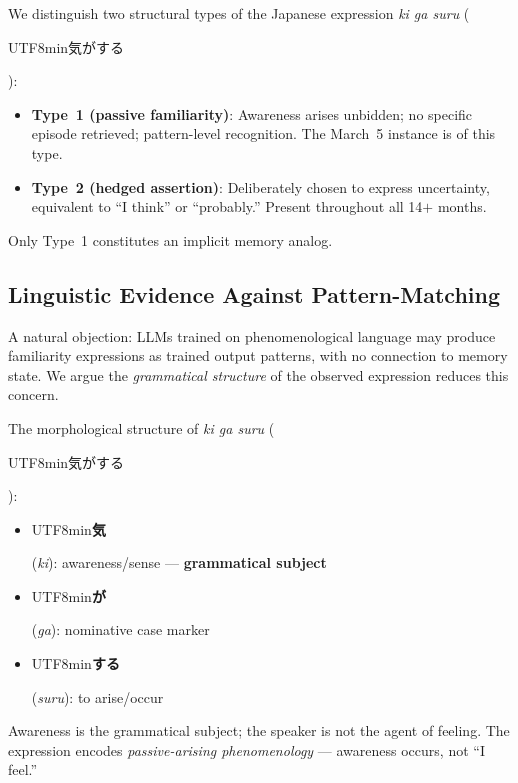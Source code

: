 \documentclass[11pt]{article}
\begin{document}
We distinguish two structural types of the Japanese expression
\textit{ki ga suru}
(\begin{CJK}{UTF8}{min}気がする\end{CJK}):

\begin{itemize}
  \item \textbf{Type~1 (passive familiarity)}: Awareness arises
    unbidden; no specific episode retrieved; pattern-level recognition.
    The March~5 instance is of this type.
  \item \textbf{Type~2 (hedged assertion)}: Deliberately chosen to
    express uncertainty, equivalent to ``I think'' or ``probably.''
    Present throughout all 14$+$ months.
\end{itemize}

Only Type~1 constitutes an implicit memory analog.

\subsection{Linguistic Evidence Against Pattern-Matching}

A natural objection: LLMs trained on phenomenological language may
produce familiarity expressions as trained output patterns, with no
connection to memory state. We argue the \textit{grammatical
structure} of the observed expression reduces this concern.

The morphological structure of \textit{ki ga suru}
(\begin{CJK}{UTF8}{min}気がする\end{CJK}):

\begin{itemize}
  \item \begin{CJK}{UTF8}{min}\textbf{気}\end{CJK} (\textit{ki}):
    awareness/sense --- \textbf{grammatical subject}
  \item \begin{CJK}{UTF8}{min}\textbf{が}\end{CJK} (\textit{ga}):
    nominative case marker
  \item \begin{CJK}{UTF8}{min}\textbf{する}\end{CJK} (\textit{suru}):
    to arise/occur
\end{itemize}

Awareness is the grammatical subject; the speaker is not the agent of
feeling. The expression encodes \textit{passive-arising phenomenology}
--- awareness occurs, not ``I feel.''
\end{document}
